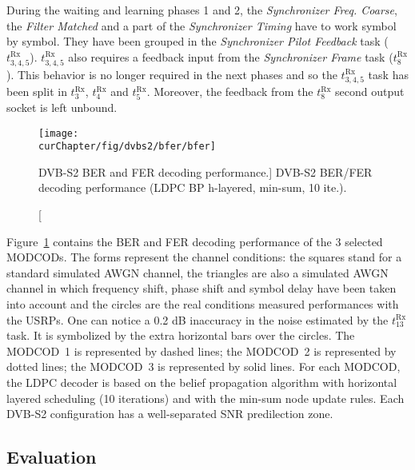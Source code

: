 During the waiting and learning phases 1 and 2, the \emph{Synchronizer Freq.
Coarse}, the \emph{Filter Matched} and a part of the \emph{Synchronizer Timing}
have to work symbol by symbol. They have been grouped in the \emph{Synchronizer
Pilot Feedback} task ($t^\text{Rx}_{3,4,5}$). $t^\text{Rx}_{3,4,5}$ also
requires a feedback input from the \emph{Synchronizer Frame} task
($t^\text{Rx}_8$). This behavior is no longer required in the next phases and so
the $t^\text{Rx}_{3,4,5}$ task has been split in $t^\text{Rx}_3$,
$t^\text{Rx}_4$ and $t^\text{Rx}_5$. Moreover, the feedback from the
$t^\text{Rx}_8$ second output socket is left unbound.

\begin{figure}[htp]
  \centering
  \texttt{[image: \\curChapter/fig/dvbs2/bfer/bfer]}
  \caption
    [DVB-S2 BER and FER decoding performance.]
    {DVB-S2 BER/FER decoding performance (LDPC BP h-layered, min-sum, 10 ite.).}
  \label{fig:sdr_dvbs2_bfer}
\end{figure}

Figure~\ref{fig:sdr_dvbs2_bfer} contains the BER and FER decoding performance of
the 3 selected MODCODs. The forms represent the channel conditions: the squares
stand for a standard simulated AWGN channel, the triangles are also a simulated
AWGN channel in which frequency shift, phase shift and symbol delay have been
taken into account and the circles are the real conditions measured performances
with the USRPs. One can notice a 0.2 dB inaccuracy in the noise estimated by the
$t^\text{Rx}_{13}$ task. It is symbolized by the extra horizontal bars over
the circles. The {\color{Paired-1} MODCOD~1} is represented by dashed lines; the
{\color{Paired-3} MODCOD~2} is represented by dotted lines; the
{\color{Paired-5} MODCOD~3} is represented by solid lines. For each MODCOD, the
LDPC decoder is based on the belief propagation algorithm with horizontal
layered scheduling (10 iterations) and with the min-sum node update rules. Each
DVB-S2 configuration has a well-separated SNR predilection zone.

\subsection{Evaluation}

